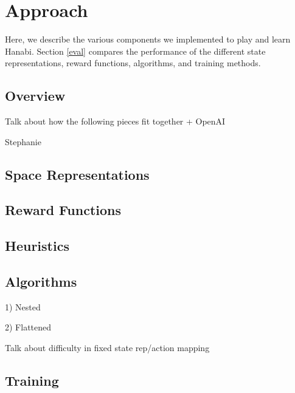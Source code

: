 \section{Approach}
\label{approach}

Here, we describe the various components we implemented to play and learn
Hanabi. Section \ref{eval} compares the performance of the different
state representations, reward functions, algorithms, and training
methods.

\subsection{Overview}

Talk about how the following pieces fit together + OpenAI



Stephanie
\subsection{Space Representations}
\subsection{Reward Functions}
\subsection{Heuristics}
\subsection{Algorithms}



1) Nested

2) Flattened

Talk about difficulty in fixed state rep/action mapping

\subsection{Training}

